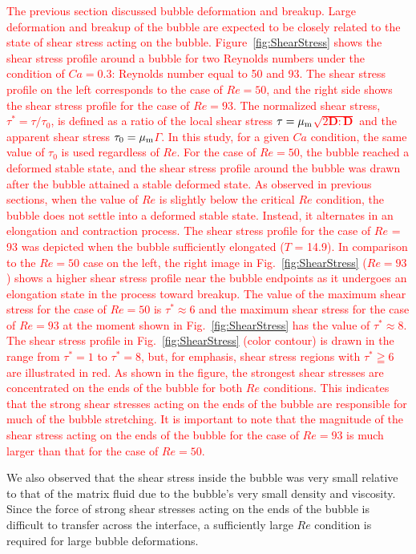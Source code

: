 \documentclass{elsarticle}
\newcommand{\vv}{\mathbf}
\newcommand{\bmD}{\vv{D}}
\begin{document}
\textcolor{red}
{
The previous section discussed bubble deformation and breakup. Large deformation and breakup of the bubble are expected to be closely related to the state of shear stress acting on the bubble.  Figure~\ref{fig:ShearStress} shows the shear stress profile around a bubble for two Reynolds numbers under the condition of $Ca = 0.3$: Reynolds number equal to 50 and 93.  The shear stress profile on the left corresponds to the case of $Re = 50$, and the right side shows the shear stress profile for the case of $Re = 93$.  The normalized shear stress, $\tau^{\ast} = \tau / \tau_{0}$, is defined as a ratio of the local shear stress $\tau = \mu_{\rm m}$$\sqrt{2\bmD:\bmD}$ and the apparent shear stress $\tau_{0} = \mu_{\rm m}$$\mathit{\Gamma}$.  In this study, for a given $Ca$ condition, the same value of $\tau_{0}$ is used regardless of $Re$.  For the case of $Re = 50$, the bubble reached a deformed stable state, and the shear stress profile around the bubble was drawn after the bubble attained a stable deformed state.  As observed in previous sections, when the value of $Re$ is slightly below the critical $Re$ condition, the bubble does not settle into a deformed stable state. Instead, it alternates in an elongation and contraction process.  The shear stress profile for the case of $Re$ = 93 was depicted when the bubble sufficiently elongated ($T$ = 14.9).  In comparison to the $Re=50$ case on the left, the right image in Fig.~\ref{fig:ShearStress} ($Re=93$) shows a higher shear stress profile near the bubble endpoints as it undergoes an elongation state in the process toward breakup.  The value of the maximum shear stress for the case of $Re = 50$ is $\tau ^{\ast} \approx 6$ and the maximum shear stress for the case of $Re = 93$ at the moment shown in Fig.~\ref{fig:ShearStress} has the value of $\tau ^{\ast} \approx 8$.  The shear stress profile in Fig.~\ref{fig:ShearStress} (color contour) is drawn in the range from $\tau^{\ast} = 1$ to $\tau ^{\ast} = 8$, but, for emphasis, shear stress regions with $\tau ^{\ast} \geqq 6$ are illustrated in red.  As shown in the figure, the strongest shear stresses are concentrated on the ends of the bubble for both $Re$ conditions.  This indicates that the strong shear stresses acting on the ends of the bubble are responsible for much of the bubble stretching.  It is important to note that the magnitude of the shear stress acting on the ends of the bubble for the case of $Re = 93$ is much larger than that for the case of $Re = 50$.  
}

We also observed that the shear stress inside the bubble was very small relative to that of the matrix fluid due to the bubble's very small density and viscosity. Since the force of strong shear stresses acting on the ends of the bubble is difficult to transfer across the interface, a sufficiently large $Re$ condition is required for large bubble deformations.
\end{document}
